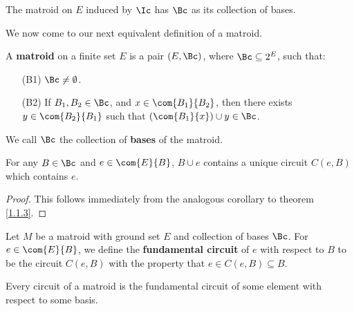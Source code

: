 \begin{corollary}
    The matroid on $E$ induced by  $\Ic$ has  $\Bc$ as its collection of bases.
\end{corollary}

We now come to our next equivalent definition of a matroid.

\begin{definition}
    A \textbf{matroid} on a finite set $E$ is a pair $(E,\Bc)$, where $\Bc
    \subseteq 2^E$, such that:
    \begin{enumerate}
        \item[(B1)] $\Bc \neq \emptyset$.

        \item [(B2)] If $B_1,B_2 \in \Bc$, and $x \in \com{B_1}{B_2}$, then
            there exists $y \in \com{B_2}{B_1}$ such that $(\com{B_1}{x}) \cup y
            \in \Bc$.
    \end{enumerate}
    We call $\Bc$ the collection of \textbf{bases} of the matroid.
\end{definition}
\begin{corollary}
    For any $B \in \Bc$ and $e \in \com{E}{B}$, $B \cup e$ contains a unique
    circuit  $C(e,B)$ which contains $e$.
\end{corollary}
\begin{proof}
    This follows immediately from the analogous corollary to theorem
    \ref{1.1.3}.
\end{proof}

\begin{definition}
    Let $M$ be a matroid with ground set $E$ and collection of bases $\Bc$. For
    $e \in \com{E}{B}$, we define the \textbf{fundamental circuit} of $e$ with
    respect to  $B$ to be the circuit $C(e,B)$ with the property that $e \in
    C(e,B) \subseteq B$.
\end{definition}

\begin{lemma}\label{1.2.4}
    Every circuit of a matroid is the fundamental circuit of some element with
    respect to some basis.
\end{lemma}



